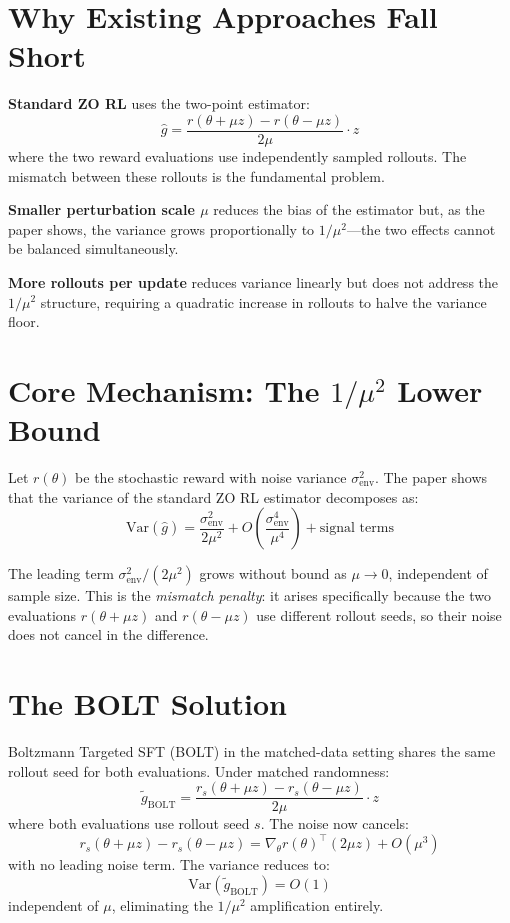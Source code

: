 \documentclass[10pt,twocolumn]{article}
\begin{document}
\section{Why Existing Approaches Fall Short}

\textbf{Standard ZO RL} uses the two-point estimator:
\[
  \hat{g} = \frac{r(\theta + \mu z) - r(\theta - \mu z)}{2\mu} \cdot z
\]
where the two reward evaluations use independently sampled rollouts. The
mismatch between these rollouts is the fundamental problem.

\textbf{Smaller perturbation scale $\mu$} reduces the bias of the
estimator but, as the paper shows, the variance grows proportionally to
$1/\mu^2$---the two effects cannot be balanced simultaneously.

\textbf{More rollouts per update} reduces variance linearly but does not
address the $1/\mu^2$ structure, requiring a quadratic increase in rollouts
to halve the variance floor.

\section{Core Mechanism: The $1/\mu^2$ Lower Bound}

Let $r(\theta)$ be the stochastic reward with noise variance
$\sigma^2_\text{env}$. The paper shows that the variance of the standard
ZO RL estimator decomposes as:
\[
  \mathrm{Var}\!\left(\hat{g}\right)
  = \frac{\sigma^2_\text{env}}{2\mu^2}
  + O\!\left(\frac{\sigma^4_\text{env}}{\mu^4}\right)
  + \text{signal terms}
\]

The leading term $\sigma^2_\text{env}/(2\mu^2)$ grows without bound as
$\mu \to 0$, independent of sample size. This is the \emph{mismatch
penalty}: it arises specifically because the two evaluations $r(\theta +
\mu z)$ and $r(\theta - \mu z)$ use different rollout seeds, so their
noise does not cancel in the difference.

\section{The BOLT Solution}

Boltzmann Targeted SFT (BOLT) in the matched-data setting shares the
same rollout seed for both evaluations. Under matched randomness:
\[
  \tilde{g}_\text{BOLT} = \frac{r_s(\theta + \mu z) - r_s(\theta - \mu z)}{2\mu} \cdot z
\]
where both evaluations use rollout seed $s$. The noise now cancels:
\[
  r_s(\theta + \mu z) - r_s(\theta - \mu z)
  = \nabla_\theta r(\theta)^\top (2\mu z) + O(\mu^3)
\]
with no leading noise term. The variance reduces to:
\[
  \mathrm{Var}\!\left(\tilde{g}_\text{BOLT}\right) = O(1)
\]
independent of $\mu$, eliminating the $1/\mu^2$ amplification entirely.
\end{document}
